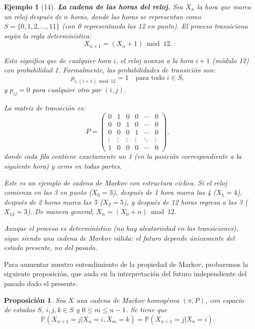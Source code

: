 \documentclass[12pt]{book}
\newtheorem{proposition}{Proposición}[chapter]
\newtheorem{example}{Ejemplo}[chapter]
\begin{document}
\begin{example}[14]
\textbf{La cadena de las horas del reloj.} Sea $X_n$ la hora que marca un reloj después de $n$ horas, donde las horas se representan como $S = \{0, 1, 2, \ldots, 11\}$ (con 0 representando las 12 en punto). El proceso transiciona según la regla determinística:
\[
X_{n+1} = (X_n + 1) \bmod 12.
\]

Esto significa que de cualquier hora $i$, el reloj avanza a la hora $i+1$ (módulo 12) con probabilidad 1. Formalmente, las probabilidades de transición son:
\[
p_{i, (i+1) \bmod 12} = 1 \quad \text{para todo } i \in S,
\]
y $p_{ij} = 0$ para cualquier otro par $(i, j)$.

La matriz de transición es:
\[
P = \begin{pmatrix}
0 & 1 & 0 & 0 & \cdots & 0 \\
0 & 0 & 1 & 0 & \cdots & 0 \\
0 & 0 & 0 & 1 & \cdots & 0 \\
\vdots & \vdots & \vdots & \vdots & \ddots & \vdots \\
1 & 0 & 0 & 0 & \cdots & 0
\end{pmatrix},
\]
donde cada fila contiene exactamente un 1 (en la posición correspondiente a la siguiente hora) y ceros en todas partes.

Este es un ejemplo de cadena de Markov con estructura \textit{cíclica}. Si el reloj comienza en las 3 en punto ($X_0 = 3$), después de 1 hora marca las 4 ($X_1 = 4$), después de 2 horas marca las 5 ($X_2 = 5$), y después de 12 horas regresa a las 3 ($X_{12} = 3$). De manera general, $X_n = (X_0 + n) \bmod 12$.

Aunque el proceso es determinístico (no hay aleatoriedad en las transiciones), sigue siendo una cadena de Markov válida: el futuro depende únicamente del estado presente, no del pasado.
\end{example}

Para aumentar nuestro entendimiento de la propiedad de Markov, probaremos la siguiente proposición, que auda en la interpretación del futuro independiente del pasado dado el presente.

\begin{proposition}
    Sea $X$ una cadena de Markov homogénea $(\pi,P)$, con espacio de estados $S$, $i,j,k\in S$  y $0\leq m \leq n-1$. Se tiene que 
    $$\mathbb{P}(X_{n+1}=j | X_n = i, X_{m} = k) = \mathbb{P}(X_{n+1}=j | X_n = i).$$ 

\end{proposition}
\end{document}
